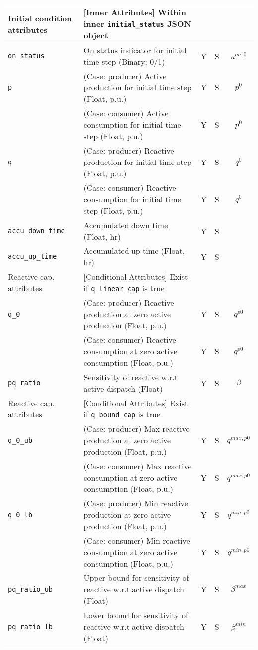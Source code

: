 \documentclass{article}
\begin{document}
\begin{center}
\small
\begin{tabular}{ l | l | c | c | c |}
  Initial condition attributes &  [Inner Attributes] Within inner {\tt initial\_status} JSON object &  &  & \\
  \hline    
  {\tt on\_status} & On status indicator for initial time step (Binary: 0/1) & Y & S & $u^{on,0}$\\
  {\tt p} & { (Case: producer) Active production for initial time step (Float, p.u.) }& Y & S & $p^0$ \\
          & { (Case: consumer) Active consumption for initial time step (Float, p.u.) }& Y & S & $p^0$ \\
  {\tt q} & { (Case: producer) Reactive production for initial time step (Float, p.u.) }& Y & S & $q^0$ \\
          & { (Case: consumer) Reactive consumption for initial time step (Float, p.u.) }& Y & S & $q^0$ \\
  {\tt accu\_down\_time} & Accumulated down time (Float, hr) & Y & S & \\  
  {\tt accu\_up\_time} & Accumulated up time (Float, hr) & Y & S & \\  
 \hline
 \hline
  Reactive cap. attributes & [Conditional Attributes] Exist if {\tt q\_linear\_cap} is true &  &  & \\
  \hline
  {\tt q\_0}               & { (Case: producer) Reactive production at zero active production (Float, p.u.) }& Y & S & $q^{p0}$\\
                           & { (Case: consumer) Reactive consumption at zero active consumption (Float, p.u.) }& Y & S & $q^{p0}$\\
  {\tt pq\_ratio}          & Sensitivity of reactive w.r.t active dispatch (Float) & Y & S & $\beta$\\
  \hline
  Reactive cap. attributes & [Conditional Attributes] Exist if {\tt q\_bound\_cap} is true &  &  & \\
  \hline
  {\tt q\_0\_ub}           & { (Case: producer) Max reactive production at zero active production (Float, p.u.)} & Y & S & $q^{max,p0}$\\
                           & { (Case: consumer) Max reactive consumption at zero active consumption (Float, p.u.)} & Y & S & $q^{max,p0}$\\
  {\tt q\_0\_lb}           & { (Case: producer) Min reactive production at zero active production (Float, p.u.)} & Y & S & $q^{min,p0}$\\
                           & { (Case: consumer) Min reactive consumption at zero active consumption (Float, p.u.)} & Y & S & $q^{min,p0}$\\
  
  {\tt pq\_ratio\_ub}      & Upper bound for sensitivity of reactive w.r.t active dispatch (Float) & Y & S & $\beta^{max}$\\
  {\tt pq\_ratio\_lb}      & Lower bound for sensitivity of reactive w.r.t active dispatch (Float) & Y & S & $\beta^{min}$\\
  \hline 
\end{tabular}
\end{center}
\end{document}

